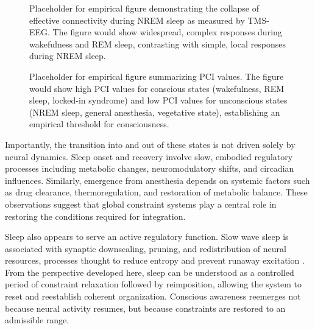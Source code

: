 \documentclass[12pt,letterpaper]{article}
\begin{document}
\begin{figure}[htbp]
\centering
{}
\caption{Placeholder for empirical figure demonstrating the collapse of effective connectivity during NREM sleep as measured by TMS-EEG. The figure would show widespread, complex responses during wakefulness and REM sleep, contrasting with simple, local responses during NREM sleep.}
\label{fig:placeholder_massimini}
\end{figure}

\begin{figure}[htbp]
\centering
{}
\caption{Placeholder for empirical figure summarizing PCI values. The figure would show high PCI values for conscious states (wakefulness, REM sleep, locked-in syndrome) and low PCI values for unconscious states (NREM sleep, general anesthesia, vegetative state), establishing an empirical threshold for consciousness.}
\label{fig:placeholder_pci}
\end{figure}

Importantly, the transition into and out of these states is not driven solely by neural dynamics. Sleep onset and recovery involve slow, embodied regulatory processes including metabolic changes, neuromodulatory shifts, and circadian influences. Similarly, emergence from anesthesia depends on systemic factors such as drug clearance, thermoregulation, and restoration of metabolic balance. These observations suggest that global constraint systems play a central role in restoring the conditions required for integration.

Sleep also appears to serve an active regulatory function. Slow wave sleep is associated with synaptic downscaling, pruning, and redistribution of neural resources, processes thought to reduce entropy and prevent runaway excitation \cite{tononi2014}. From the perspective developed here, sleep can be understood as a controlled period of constraint relaxation followed by reimposition, allowing the system to reset and reestablish coherent organization. Conscious awareness reemerges not because neural activity resumes, but because constraints are restored to an admissible range.
\end{document}
